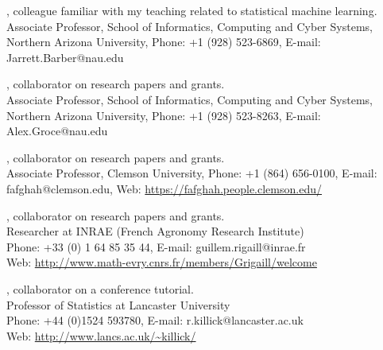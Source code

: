 \documentclass[margin,line]{res}
\begin{document}
\begin{resume}
, colleague familiar with my teaching related to statistical machine learning.\\
Associate Professor, School of Informatics, Computing and Cyber Systems,\\
Northern Arizona University, 
Phone: +1 (928) 523-6869, E-mail: Jarrett.Barber@nau.edu

, collaborator on research papers and grants.\\
Associate Professor, School of Informatics, Computing and Cyber Systems,\\
Northern Arizona University, 
Phone: +1 (928) 523-8263, E-mail: Alex.Groce@nau.edu

, collaborator on research papers and grants.\\
Associate Professor, Clemson University, Phone: +1 (864) 656-0100, E-mail: fafghah@clemson.edu, Web: \url{https://fafghah.people.clemson.edu/}

, collaborator on research papers and grants.\\
Researcher at INRAE (French Agronomy Research Institute)\\
Phone: +33 (0) 1 64 85 35 44, E-mail: guillem.rigaill@inrae.fr\\
Web: \url{http://www.math-evry.cnrs.fr/members/Grigaill/welcome}

, collaborator on a conference tutorial.\\
Professor of Statistics at Lancaster University\\
Phone: +44 (0)1524 593780, E-mail: r.killick@lancaster.ac.uk\\
Web: \url{http://www.lancs.ac.uk/~killick/}

\end{resume}
\end{document}
